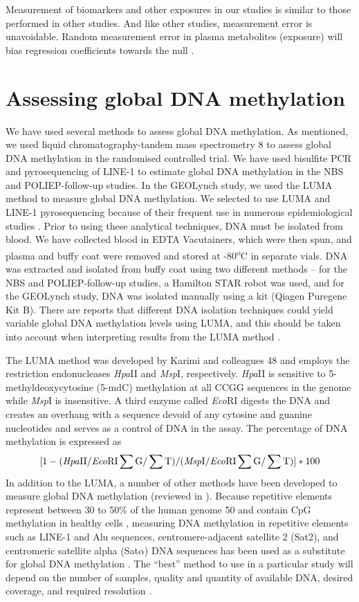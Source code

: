 \noindent Measurement of biomarkers and other exposures in our studies is similar to those performed in other studies. And like other studies, measurement error is unavoidable. Random measurement error in plasma metabolites (exposure) will bias regression coefficients towards the null \cite{c743,c744}.
 
\section{Assessing global DNA methylation} %
\noindent We have used several methods to assess global DNA methylation. As mentioned, we used liquid chromatography-tandem mass spectrometry 8 to assess global DNA methylation in the randomised controlled trial. We have used bisulfite PCR and pyrosequencing of LINE-1 to estimate global DNA methylation in the NBS and POLIEP-follow-up studies. In the GEOLynch study, we used the LUMA method to measure global DNA methylation. We selected to use LUMA and LINE-1 pyrosequencing because of their frequent use in numerous epidemiological studies \cite{c745,c746}. Prior to using these analytical techniques, DNA must be isolated from blood. We have collected blood in EDTA Vacutainers, which were then spun, and plasma and buffy coat were removed and stored at -80\textsuperscript{o}C in separate vials. DNA was extracted and isolated from buffy coat using two different methods -- for the NBS and POLIEP-follow-up studies, a Hamilton STAR robot was used, and for the GEOLynch study, DNA was isolated manually using a kit (Qiagen Puregene Kit B). There are reports that different DNA isolation techniques could yield variable global DNA methylation levels using LUMA, and this should be taken into account when interpreting results from the LUMA method \cite{c747}.

\noindent The LUMA method was developed by Karimi and colleagues 48 and employs the restriction endonucleases \emph{Hpa}II and \emph{Msp}I, respectively. \emph{Hpa}II is sensitive to 5-methyldeoxycytosine (5-mdC) methylation at all CCGG sequences in the genome while \emph{Msp}I is insensitive. A third enzyme called \emph{Eco}RI digests the DNA and creates an overhang with a sequence devoid of any cytosine and guanine nucleotides and serves as a control of DNA in the assay. The percentage of DNA methylation is expressed as $$[1-(\text{\emph{Hpa}II}  / \text{\emph{Eco}RI}  \sum \text{G}/  \sum \text{T})/( \text{\emph{Msp}I} / \text{\emph{Eco}RI}  \sum \text{G}/  \sum \text{T})]*100$$ In addition to the LUMA, a number of other methods have been developed to measure global DNA methylation (reviewed in \cite{c749}). Because repetitive elements represent between 30 to 50\% of the human genome 50 and contain CpG methylation in healthy cells \cite{c751}, measuring DNA methylation in repetitive elements such as LINE-1 and Alu sequences, centromere-adjacent satellite 2 (Sat2), and centromeric satellite alpha (Sat$\alpha$) DNA sequences has been used as a substitute for global DNA methylation \cite{c752}. The ``best'' method to use in a particular study will depend on the number of samples, quality and quantity of available DNA, desired coverage, and required resolution \cite{c749}.

